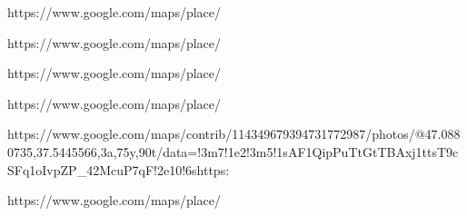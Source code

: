 https://www.google.com/maps/place/%


https://www.google.com/maps/place/%

https://www.google.com/maps/place/%

https://www.google.com/maps/place/%

https://www.google.com/maps/contrib/114349679394731772987/photos/@47.0880735,37.5445566,3a,75y,90t/data=!3m7!1e2!3m5!1sAF1QipPuTtGtTBAxj1ttsT9cSFq1oIvpZP_42McuP7qF!2e10!6shttps:%

https://www.google.com/maps/place/%

